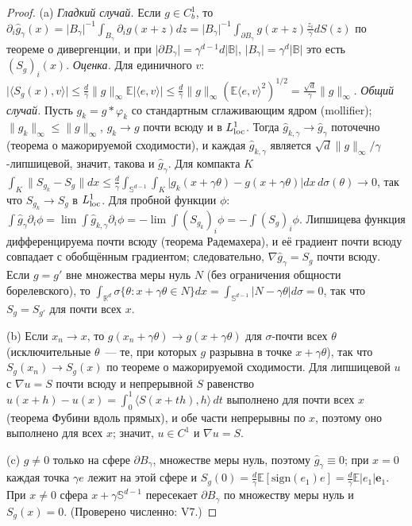 \documentclass[11pt,a4paper]{article}
\numberwithin{equation}{section}
\theoremstyle{definition}
\theoremstyle{remark}
\newcommand{\E}{\mathbb E}\newcommand{\R}{\mathbb R}\newcommand{\N}{\mathbb N}\let\Prob\relax\newcommand{\Prob}{\mathbb P}
\newcommand{\norm}[1]{\lVert #1\rVert}\newcommand{\abs}[1]{\lvert #1\rvert}\newcommand{\ip}[2]{\langle #1,#2\rangle}
\newcommand{\Sph}{\mathbb S^{d-1}}\newcommand{\Ball}{\mathbb B}
\begin{document}
\begin{proof}
(a) \emph{Гладкий случай.} Если $g\in C^1_b$, то $\partial_i\hat g_\gamma(x)=\abs{B_\gamma}^{-1}\int_{B_\gamma}\partial_ig(x+z)dz=\abs{B_\gamma}^{-1}\int_{\partial B_\gamma}g(x+z)\frac{z_i}\gamma dS(z)$ по теореме о дивергенции, и при $\abs{\partial B_\gamma}=\gamma^{d-1}d\abs{\Ball}$, $\abs{B_\gamma}=\gamma^d\abs\Ball$ это есть $(S_g)_i(x)$.
\emph{Оценка.} Для единичного $v$: $\abs{\ip{S_g(x)}v}\le\frac d\gamma\norm g_\infty\E\abs{\ip ev}\le\frac d\gamma\norm g_\infty(\E\ip ev^2)^{1/2}=\frac{\sqrt d}\gamma\norm g_\infty$.
\emph{Общий случай.} Пусть $g_k=g*\varphi_k$ со стандартным сглаживающим ядром (mollifier); $\norm{g_k}_\infty\le\norm g_\infty$, $g_k\to g$ почти всюду и в $L^1_{\rm loc}$. Тогда $\hat g_{k,\gamma}\to\hat g_\gamma$ поточечно (теорема о мажорируемой сходимости), и каждая $\hat g_{k,\gamma}$ является $\sqrt d\norm g_\infty/\gamma$-липшицевой, значит, такова и $\hat g_\gamma$. Для компакта $K$
$\int_K\norm{S_{g_k}-S_g}dx\le\frac d\gamma\int_{\Sph}\int_K\abs{g_k(x+\gamma\theta)-g(x+\gamma\theta)}dx\,d\sigma(\theta)\to0$, так что $S_{g_k}\to S_g$ в $L^1_{\rm loc}$. Для пробной функции $\phi$:
$\int\hat g_\gamma\partial_i\phi=\lim\int\hat g_{k,\gamma}\partial_i\phi=-\lim\int(S_{g_k})_i\phi=-\int(S_g)_i\phi$. Липшицева функция дифференцируема почти всюду (теорема Радемахера), и её градиент почти всюду совпадает с обобщённым градиентом; следовательно, $\nabla\hat g_\gamma=S_g$ почти всюду.
Если $g=g'$ вне множества меры нуль $N$ (без ограничения общности борелевского), то $\int_{\R^d}\sigma\{\theta:x+\gamma\theta\in N\}dx=\int_{\Sph}\abs{N-\gamma\theta}d\sigma=0$, так что $S_g=S_{g'}$ для почти всех $x$.

(b) Если $x_n\to x$, то $g(x_n+\gamma\theta)\to g(x+\gamma\theta)$ для $\sigma$-почти всех $\theta$ (исключительные $\theta$~--- те, при которых $g$ разрывна в точке $x+\gamma\theta$), так что $S_g(x_n)\to S_g(x)$ по теореме о мажорируемой сходимости. Для липшицевой $u$ с $\nabla u=S$ почти всюду и непрерывной $S$ равенство $u(x+h)-u(x)=\int_0^1\ip{S(x+th)}h\,dt$ выполнено для почти всех $x$ (теорема Фубини вдоль прямых), и обе части непрерывны по $x$, поэтому оно выполнено для всех $x$; значит, $u\in C^1$ и $\nabla u=S$.

(c) $g\ne0$ только на сфере $\partial B_\gamma$, множестве меры нуль, поэтому $\hat g_\gamma\equiv0$; при $x=0$ каждая точка $\gamma e$ лежит на этой сфере и $S_g(0)=\frac d\gamma\E[\mathrm{sign}(e_1)e]=\frac d\gamma\E\abs{e_1}\mathbf e_1$. При $x\ne0$ сфера $x+\gamma\Sph$ пересекает $\partial B_\gamma$ по множеству меры нуль и $S_g(x)=0$. (Проверено численно: V7.)
\end{proof}
\end{document}
